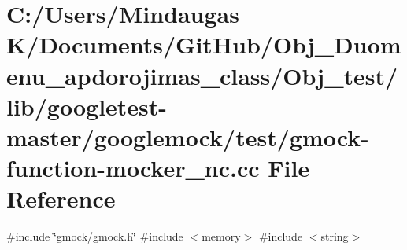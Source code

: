 \hypertarget{_obj__test_2lib_2googletest-master_2googlemock_2test_2gmock-function-mocker__nc_8cc}{}\section{C\+:/\+Users/\+Mindaugas K/\+Documents/\+Git\+Hub/\+Obj\+\_\+\+Duomenu\+\_\+apdorojimas\+\_\+class/\+Obj\+\_\+test/lib/googletest-\/master/googlemock/test/gmock-\/function-\/mocker\+\_\+nc.cc File Reference}
\label{_obj__test_2lib_2googletest-master_2googlemock_2test_2gmock-function-mocker__nc_8cc}
{\ttfamily \#include \char`\"{}gmock/gmock.\+h\char`\"{}}\newline
{\ttfamily \#include $<$memory$>$}\newline
{\ttfamily \#include $<$string$>$}\newline

